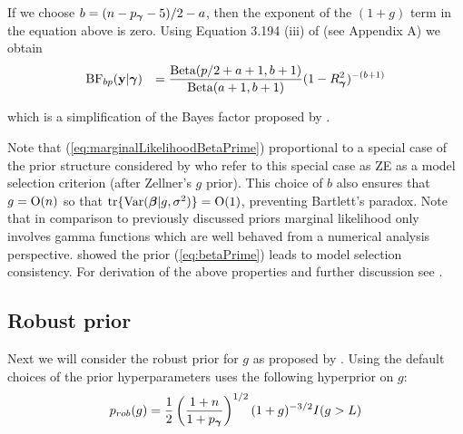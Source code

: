 \noindent If we choose 
$b = (n - p_{\boldsymbol \gamma} - 5)/2 - a$, then the exponent of the $(1 + g)$ term in the equation above is zero.
Using Equation 3.194 (iii) of \cite{Gradshteyn2007}
(see Appendix A) we obtain
\begin{equation}\label{eq:marginalLikelihoodBetaPrime}
\begin{array}{rl}
\ds \mbox{BF}_{bp}(\vy|\vgamma) 
& \ds 
=   
\frac{\mbox{Beta}(p/2 + a + 1,b + 1)}{\mbox{Beta}(a+1,b+1)} (1-R_\vgamma^2)^{-(b + 1)}
%
\end{array}
\end{equation}

\noindent which is a simplification of the Bayes factor proposed by
\cite{Maruyama2011}.


Note that (\ref{eq:marginalLikelihoodBetaPrime}) proportional
to a special case of the prior structure considered by \cite{Maruyama2011}
who refer to this special case as ZE as a model selection criterion (after Zellner's $g$ prior). This choice of $b$ also ensures that $g = \text{O}(n)$ so that $\text{tr}\{\text{Var}({\boldsymbol \beta} | g, \sigma^2)\} = \text{O}(1)$, preventing Bartlett's paradox. 
Note that in comparison to previously discussed priors
marginal likelihood only involves gamma functions which
are well behaved from a numerical analysis perspective. 
\cite{Maruyama2011} showed the prior (\ref{eq:betaPrime}) leads to model
selection consistency.
For derivation of the above properties and further discussion see \cite{Maruyama2011}.


\subsection{Robust prior}  

Next we will consider the robust prior for $g$ as proposed by \cite{Bayarri2012}. Using the default
choices of the prior hyperparameters \cite{Bayarri2012} uses the following hyperprior on $g$:
\begin{equation}\label{eq:robustPrior}
p_{{rob}}(g) = \frac{1}{2}\left(\frac{1+n}{1 + p_{\boldsymbol \gamma}}  \right)^{1/2} (1 + g)^{-3/2}I(g > L)
\end{equation}
 
